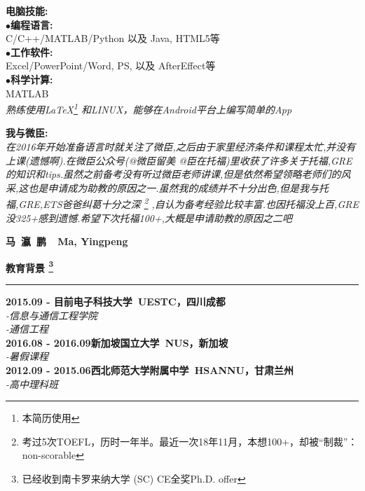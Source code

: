 \documentclass[a4paper,11pt,final]{memoir}
\newcommand{\myThemeColor}{RoyalBlue}
\newcommand{\SmallSep}{\vspace{0.9em}}
\newcommand{\CVSection}[1]
	{\Large\textbf{#1}\par
	\vspace{0.2cm}\normalsize\normalfont}
\newcommand{\CVItem}[1]
	{\textbf{\color{\myThemeColor} #1}}
\begin{document}
\begin{CJK*}{UTF8}{gbsn}
\begin{flushright}
	\CVItem{{\large 电脑技能:}}\\
	$\bullet$\textbf{编程语言:}\\ C/C++/MATLAB/Python 以及 Java, HTML5等 \\
	$\bullet$\textbf{工作软件:}\\ Excel/PowerPoint/Word, PS, 以及 AfterEffect等 \\
	$\bullet$\textbf{科学计算:}\\ MATLAB \\
	\SmallSep
	\textit{熟练使用\LaTeX \footnote{本简历使用} 和LINUX，能够在Android平台上编写简单的App}

	\CVItem{{\large 我与微臣:}}\\
	\textit{在2016年开始准备语言时就关注了微臣,之后由于家里经济条件和课程太忙,并没有上课(遗憾啊).在微臣公众号(@微臣留美 @臣在托福)里收获了许多关于托福,GRE的知识和tips.虽然之前备考没有听过微臣老师讲课,但是依然希望领略老师们的风采,这也是申请成为助教的原因之一.虽然我的成绩并不十分出色,但是我与托福,GRE,ETS爸爸纠葛十分之深 \footnote{考过5次TOEFL，历时一年半。最近一次18年11月，本想100+，却被“制裁”：non-scorable} ,自认为备考经验比较丰富.也因托福没上百,GRE没325+感到遗憾.希望下次托福100+,大概是申请助教的原因之二吧}
	\SmallSep
\end{flushright}\normalsize
\framebreak


\Huge\bfseries {\color{\myThemeColor} 马~瀛~鹏~~Ma, Yingpeng}\\
\normalsize\normalfont

\CVSection{教育背景 \footnote{已经收到南卡罗来纳大学 (SC) CE全奖Ph.D. offer}}
\hrule
\SmallSep
\CVItem{2015.09 - 目前\hfill\textsc{电子科技大学~UESTC，四川成都}}\\
\textit{-信息与通信工程学院}\\
\textit{-通信工程}
\\
\CVItem{2016.08 - 2016.09\hfill\textsc{新加坡国立大学~NUS，新加坡}}\\
\textit{-暑假课程}
\\
\CVItem{2012.09 - 2015.06\hfill\textsc{西北师范大学附属中学~HSANNU，甘肃兰州}}\\
\textit{-高中理科班}
\\



\end{CJK*}
\end{document}
